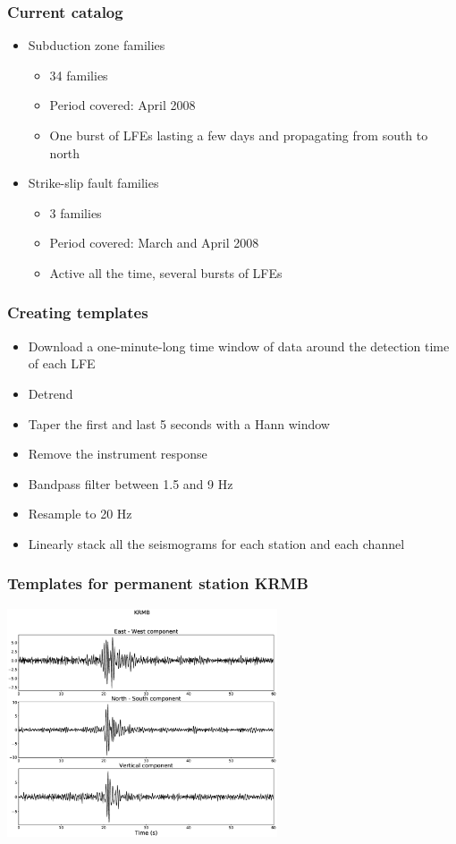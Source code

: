 \documentclass{beamer}
\begin{document}
	\begin{frame}
		\frametitle{Current catalog}
		\begin{itemize}
			\item Subduction zone families
			\begin{itemize}
				\item 34 families
				\item Period covered: April 2008
				\item One burst of LFEs lasting a few days and propagating from south to north
			\end{itemize}
			\item Strike-slip fault families
			\begin{itemize}
				\item 3 families
				\item Period covered: March and April 2008
				\item Active all the time, several bursts of LFEs
			\end{itemize}
		\end{itemize}
	\end{frame}

	\begin{frame}
		\frametitle{Creating templates}
		\begin{itemize}
			\item Download a one-minute-long time window of data around the detection time of each LFE
			\item Detrend
			\item Taper the first and last 5 seconds with a Hann window
			\item Remove the instrument response
			\item Bandpass filter between 1.5 and 9 Hz
			\item Resample to 20 Hz
			\item Linearly stack all the seismograms for each station and each channel
		\end{itemize}
	\end{frame}

	\begin{frame}
		\frametitle{Templates for permanent station KRMB}
		\begin{center}
			\includegraphics[width=8cm, trim={4cm 2cm 4cm 3cm}, clip]{catalog_SC/08042114048_KRMB.eps}
		\end{center}
	\end{frame}
\end{document}
